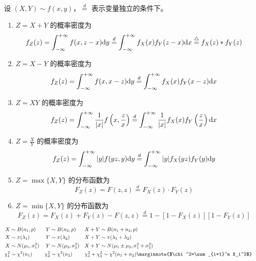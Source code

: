 \documentclass{ctexbook}
\def\diff{\textnormal{d}}
\begin{document}
\begin{proposition}[卷积公式法]
    设 $(X,Y)\sim f(x,y)$，$\overset{d}{=}$ 表示变量独立的条件下。
    \begin{enumerate}
        \item $Z=X+Y$ 的概率密度为
        \begin{equation}
            f_Z(z)=\int_{-\infty}^{+\infty}f(x,z-x)\diff y\overset{d}{=}\int_{-\infty}^{+\infty}f_X(x)f_Y(z-x)\diff x\overset{\triangle}{=}f_X(z)*f_Y(z)
        \end{equation}
        \item $Z=X-Y$ 的概率密度为
        \begin{equation}
            f_Z(z)=\int_{-\infty}^{+\infty}f(x,x-z)\diff y\overset{d}{=}\int_{-\infty}^{+\infty}f_X(x)f_Y(x-z)\diff x
        \end{equation}
        \item $Z=XY$ 的概率密度为
        \begin{equation}
            f_Z(z)=\int_{-\infty}^{+\infty}\frac{1}{|x|}f\left(x,\frac{z}{x}\right)\overset{d}{=}\int_{-\infty}^{+\infty}\frac{1}{|x|}f_X(x)f_Y\left(\frac{z}{x}\right)\diff x
        \end{equation}
        \item $Z=\frac{X}{Y}$ 的概率密度为
        \begin{equation}
            f_Z(z)=\int_{-\infty}^{+\infty}|y|f(yz,y)\diff y\overset{d}{=}\int_{-\infty}^{+\infty}|y|f_X(yz)f_Y(y)\diff y
        \end{equation}
        \item $Z=\max\{X,Y\}$ 的分布函数为
        \begin{equation}
            F_Z(z)=F(z,z)\overset{d}{=}F_X(z)\cdot F_Y(z)
        \end{equation}
        \item $Z=\min\{X,Y\}$ 的分布函数为
        \begin{equation}
            F_Z(z)=F_X(z)+F_Y(z)-F(z,z)\overset{d}{=}1-[1-F_X(z)][1-F_Y(z)]
        \end{equation}
    \end{enumerate}
\end{proposition}

\begin{theorem}[可加性]
    \begin{align}
        X&\sim B(n_1,p) & Y&\sim B(n_2,p) && X+Y\sim B(n_1+n_2,p) \\
        X&\sim \pi(\lambda_1) & Y&\sim \pi(\lambda_2) && X+Y\sim \pi(\lambda_1+\lambda_2)\\
        X&\sim N(\mu_1,\sigma_1^2) & Y&\sim N(\mu_2,\sigma_2^2) && X+Y\sim N(\mu_1\pm \mu_2,\sigma_1^2+\sigma_2^2)\\
        \chi_1^2&\sim\chi^2(n_1) & \chi_2^2&\sim\chi^2(n_2) && \chi_1^2+\chi_2^2\sim\chi^2(n_1+n_2) \marginnote{$\chi^2=\sum_{i=1}^n X_i^2$}
    \end{align}
\end{theorem}
\end{document}
